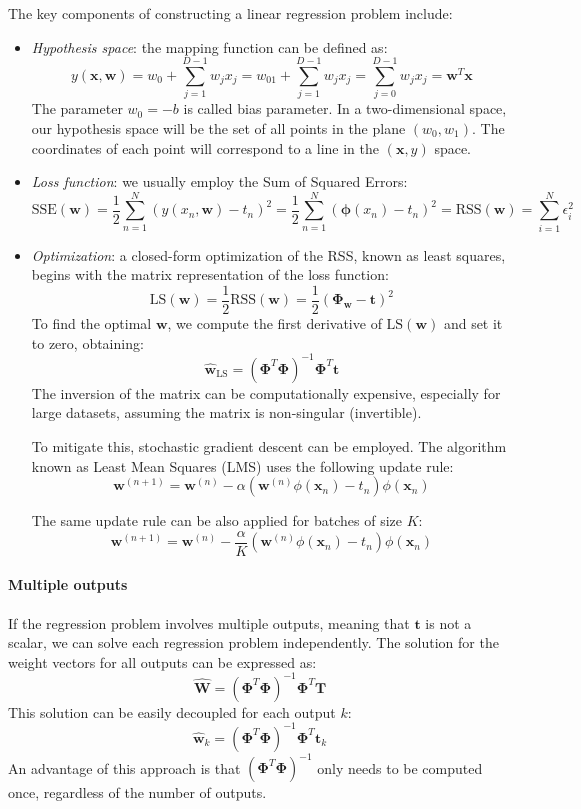 The key components of constructing a linear regression problem include:
\begin{itemize}
    \item \textit{Hypothesis space}: the mapping function can be defined as: 
        \[y(\mathbf{x},\mathbf{w})=w_0+\sum_{j=1}^{D-1}w_j x_j=w_01+\sum_{j=1}^{D-1}w_j x_j=\sum_{j=0}^{D-1}w_j x_j=\mathbf{w}^T\mathbf{x}\]
        The parameter $w_0=-b$ is called bias parameter. 
        In a two-dimensional space, our hypothesis space will be the set of all points in the plane $(w_0,w_1)$. 
        The coordinates of each point will correspond to a line in the $\left( \mathbf{x}, y \right)$ space.
    \item \textit{Loss function}: we usually employ the Sum of Squared Errors: 
            \[\text{SSE}(\mathbf{w})=\dfrac{1}{2}\sum_{n=1}^{N}{\left( y(x_n, \mathbf{w})-t_n \right)}^2=\dfrac{1}{2}\sum_{n=1}^{N}{\left( \boldsymbol{\phi}(x_n)-t_n \right)}^2=\text{RSS}(\mathbf{w})=\sum_{i=1}^{N}\epsilon^2_i\]
    \item \textit{Optimization}: a closed-form optimization of the RSS, known as least squares, begins with the matrix representation of the loss function:
        \[\text{LS}(\mathbf{w})=\dfrac{1}{2}\text{RSS}(\mathbf{w})=\dfrac{1}{2}{\left( \boldsymbol{\Phi}_{\mathbf{w}}-\mathbf{t} \right)}^2\]
        To find the optimal $\mathbf{w}$, we compute the first derivative of $\text{LS}(\mathbf{w})$ and set it to zero, obtaining: 
        \[\hat{\mathbf{w}}_{\text{LS}}={\left( \boldsymbol{\Phi}^T\boldsymbol{\Phi}\right)}^{-1}\boldsymbol{\Phi}^T\mathbf{t}\]
        The inversion of the matrix can be computationally expensive, especially for large datasets, assuming the matrix is non-singular (invertible). 
        
        To mitigate this, stochastic gradient descent can be employed.
        The algorithm known as Least Mean Squares (LMS) uses the following update rule:
        \[\mathbf{w}^{(n+1)}= \mathbf{w}^{(n)}-\alpha\left( \mathbf{w}^{(n)}\phi(\mathbf{x}_n)-t_n \right)\phi(\mathbf{x}_n)\]

        The same update rule can be also applied for batches of size $K$: 
        \[\mathbf{w}^{(n+1)}= \mathbf{w}^{(n)}-\dfrac{\alpha}{K}\left( \mathbf{w}^{(n)}\phi(\mathbf{x}_n)-t_n \right)\phi(\mathbf{x}_n)\]
\end{itemize}

\paragraph*{Multiple outputs}
If the regression problem involves multiple outputs, meaning that $\mathbf{t}$ is not a scalar, we can solve each regression problem independently.
The solution for the weight vectors for all outputs can be expressed as:
\[\hat{\mathbf{W}}={\left( \boldsymbol{\Phi}^T\boldsymbol{\Phi}\right)}^{-1}\boldsymbol{\Phi}^T\mathbf{T}\]
This solution can be easily decoupled for each output $k$: 
\[\hat{\mathbf{w}}_k={\left( \boldsymbol{\Phi}^T\boldsymbol{\Phi}\right)}^{-1}\boldsymbol{\Phi}^T\mathbf{t}_k\]
An advantage of this approach is that ${\left( \boldsymbol{\Phi}^T\boldsymbol{\Phi}\right)}^{-1}$ only needs to be computed once, regardless of the number of outputs.

